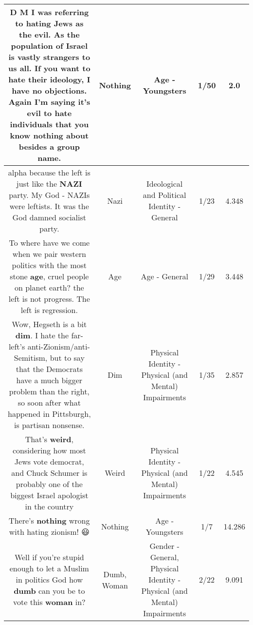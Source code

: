 \documentclass[11pt]{article}
\newlength\mylength
\begin{document}
\begin{center}
\begin{longtable}{|C{.65\mylength}|C{.30\mylength}|C{.12\mylength}|C{.12\mylength}|C{.12\mylength}|}
  \small D M I was referring to hating Jews as the evil.  As the population of Israel is vastly strangers to us all.  If you want to hate their ideology, I have no objections.  Again I'm saying it's evil to hate individuals that you know \textbf{nothing} about besides a group name.\normalsize   & Nothing & Age - Youngsters & 1/50 & 2.0 \\  \hline
  \small alpha because the left is just like the \textbf{NAZI} party.  My God - NAZIs were leftists.  It was the God damned socialist party.\normalsize   & Nazi &  Ideological and Political Identity - General & 1/23 & 4.348 \\  \hline
  \small To where have we come when we pair western politics with the most stone \textbf{age}, cruel people on planet earth? the left is not progress. The left is regression.\normalsize   & Age & Age - General & 1/29 & 3.448 \\  \hline
  \small Wow, Hegseth is a bit \textbf{dim}. I hate the far-left's anti-Zionism/anti-Semitism, but to say that the Democrats have a much bigger problem than the right, so soon after what happened in Pittsburgh, is partisan nonsense.\normalsize   & Dim & Physical Identity - Physical (and Mental) Impairments & 1/35 & 2.857 \\  \hline
  \small That's \textbf{weird}, considering how most Jews vote democrat, and Chuck Schumer is probably one of the biggest Israel apologist in the country\normalsize   & Weird & Physical Identity - Physical (and Mental) Impairments & 1/22 & 4.545 \\  \hline
  \small There's \textbf{nothing} wrong with hating zionism!  😃\normalsize   & Nothing & Age - Youngsters & 1/7 & 14.286 \\  \hline
  \small Well if you're stupid enough to let a Muslim in politics God how \textbf{dumb} can you be to vote this \textbf{woman} in?\normalsize   & Dumb, Woman & Gender - General, Physical Identity - Physical (and Mental) Impairments & 2/22 & 9.091 \\  \hline

\end{longtable}
\end{center}
\end{document}
